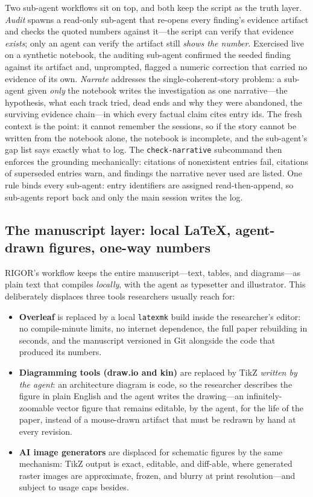 \documentclass[11pt]{article}
\begin{document}
Two sub-agent workflows sit on top, and both keep the script as the truth
layer. \emph{Audit} spawns a read-only sub-agent that re-opens every finding's
evidence artifact and checks the quoted numbers against it---the script can
verify that evidence \emph{exists}; only an agent can verify the artifact still
\emph{shows the number}. Exercised live on a synthetic notebook, the auditing
sub-agent confirmed the seeded finding against its artifact and, unprompted,
flagged a numeric correction that carried no evidence of its own.
\emph{Narrate} addresses the single-coherent-story problem: a sub-agent given
\emph{only} the notebook writes the investigation as one narrative---the
hypothesis, what each track tried, dead ends and why they were abandoned, the
surviving evidence chain---in which every factual claim cites entry ids. The
fresh context is the point: it cannot remember the sessions, so if the story
cannot be written from the notebook alone, the notebook is incomplete, and the
sub-agent's gap list says exactly what to log. The \texttt{check-narrative}
subcommand then enforces the grounding mechanically: citations of nonexistent
entries fail, citations of superseded entries warn, and findings the narrative
never used are listed. One rule binds every sub-agent: entry identifiers are
assigned read-then-append, so sub-agents report back and only the main session
writes the log.

\subsection{The manuscript layer: local \LaTeX{}, agent-drawn figures, one-way numbers}
\label{sec:paper}

RIGOR's workflow keeps the entire manuscript---text, tables, and diagrams---as
plain text that compiles \emph{locally}, with the agent as typesetter and
illustrator. This deliberately displaces three tools researchers usually
reach for:

\begin{itemize}
\item \textbf{Overleaf} is replaced by a local \texttt{latexmk} build inside
the researcher's editor: no compile-minute limits, no internet dependence,
the full paper rebuilding in seconds, and the manuscript versioned in Git
alongside the code that produced its numbers.
\item \textbf{Diagramming tools (draw.io and kin)} are replaced by TikZ
\emph{written by the agent}: an architecture diagram is code, so the
researcher describes the figure in plain English and the agent writes the
drawing---an infinitely-zoomable vector figure that remains editable, by the
agent, for the life of the paper, instead of a mouse-drawn artifact that
must be redrawn by hand at every revision.
\item \textbf{AI image generators} are displaced for schematic figures by the
same mechanism: TikZ output is exact, editable, and diff-able, where
generated raster images are approximate, frozen, and blurry at print
resolution---and subject to usage caps besides.
\end{itemize}
\end{document}
